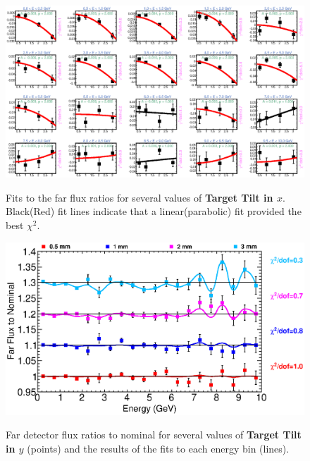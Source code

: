 {\begin{figure}[ht]
  \begin{center}
    {\includegraphics[width=5.0in]{figures/TargetXTilt_far_fits.eps}}
  \end{center}
\caption{ Fits to the far flux ratios for several values of {\bf Target Tilt in $x$}. Black(Red) fit lines indicate that a linear(parabolic) fit provided the best $\chi^2$. }
\end{figure}

\clearpage

\begin{figure}[ht]
  \begin{center}
    {\includegraphics[width=6.0in]{figures/TargetYTilt_far_summary.eps}}
  \end{center}
\caption{ Far detector flux ratios to nominal for several values of {\bf Target Tilt in $y$} (points) and the results of the fits to each energy bin (lines).}
\end{figure}

}
